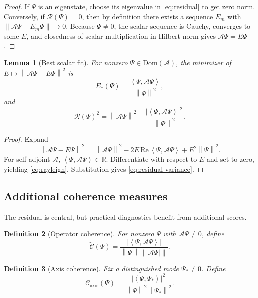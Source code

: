\documentclass[11pt]{article}
\newtheorem{definition}{Definition}[section]
\newtheorem{lemma}[definition]{Lemma}
\theoremstyle{remark}
\newcommand{\R}{\mathbb{R}}
\newcommand{\ip}[2]{\left\langle #1, #2 \right\rangle}
\newcommand{\norm}[1]{\left\lVert #1 \right\rVert}
\newcommand{\Aop}{\mathcal{A}}
\newcommand{\Res}{\mathcal{R}}
\newcommand{\COp}{\widetilde{\mathcal{C}}}
\newcommand{\CAxis}{\mathcal{C}_{\mathrm{axis}}}
\begin{document}
\begin{proof}
If $\Psi$ is an eigenstate, choose its eigenvalue in \eqref{eq:residual} to get zero norm. Conversely, if $\Res(\Psi)=0$, then by definition there exists a sequence $E_m$ with $\norm{\Aop\Psi-E_m\Psi}\to 0$. Because $\Psi\neq 0$, the scalar sequence is Cauchy, converges to some $E$, and closedness of scalar multiplication in Hilbert norm gives $\Aop\Psi=E\Psi$.
\end{proof}

\begin{lemma}[Best scalar fit]
For nonzero $\Psi\in\mathrm{Dom}(\Aop)$, the minimizer of $E\mapsto \norm{\Aop\Psi-E\Psi}^2$ is
\begin{equation}
E_*(\Psi)=\frac{\ip{\Psi}{\Aop\Psi}}{\norm{\Psi}^2},
\label{eq:rayleigh}
\end{equation}
and
\begin{equation}
\Res(\Psi)^2
=
\norm{\Aop\Psi}^2-\frac{|\ip{\Psi}{\Aop\Psi}|^2}{\norm{\Psi}^2}.
\label{eq:residual-variance}
\end{equation}
\end{lemma}

\begin{proof}
Expand
\[
\norm{\Aop\Psi-E\Psi}^2
=
\norm{\Aop\Psi}^2-2E\,\mathrm{Re}\,\ip{\Psi}{\Aop\Psi}+E^2\norm{\Psi}^2.
\]
For self-adjoint $\Aop$, $\ip{\Psi}{\Aop\Psi}\in\R$. Differentiate with respect to $E$ and set to zero, yielding \eqref{eq:rayleigh}. Substitution gives \eqref{eq:residual-variance}.
\end{proof}

\subsection{Additional coherence measures}

The residual is central, but practical diagnostics benefit from additional scores.

\begin{definition}[Operator coherence]
For nonzero $\Psi$ with $\Aop\Psi\neq 0$, define
\begin{equation}
\COp(\Psi)
=
\frac{|\ip{\Psi}{\Aop\Psi}|}{\norm{\Psi}\,\norm{\Aop\Psi|}
}.
\label{eq:operator-coherence}
\end{equation}
\end{definition}

\begin{definition}[Axis coherence]
Fix a distinguished mode $\Psi_*\neq 0$. Define
\begin{equation}
\CAxis(\Psi)
=
\frac{|\ip{\Psi}{\Psi_*}|^2}{\norm{\Psi}^2\norm{\Psi_*}^2}.
\label{eq:axis-coherence}
\end{equation}
\end{definition}
\end{document}
